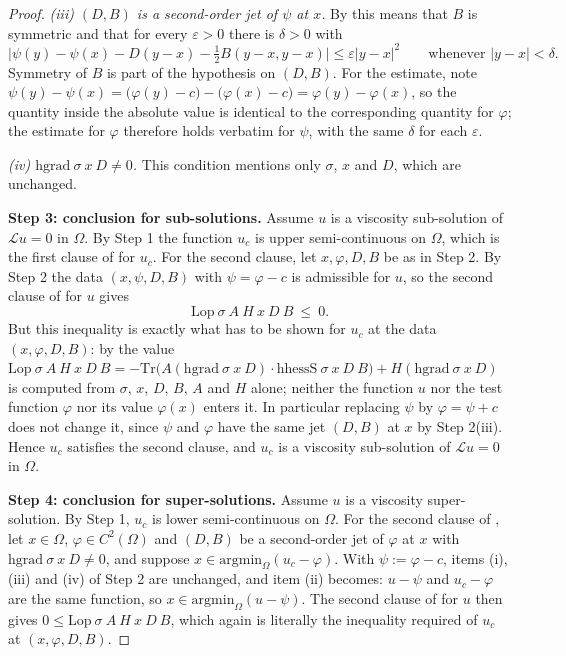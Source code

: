 \begin{proof}
\emph{(iii) $(D,B)$ is a second-order jet of $\psi$ at $x$.} By  this
means that $B$ is symmetric and that for every $\varepsilon>0$ there is $\delta>0$ with
\[
 \Big|\psi(y)-\psi(x)-D(y-x)-\tfrac12B(y-x,y-x)\Big|\le\varepsilon|y-x|^{2}
 \qquad\text{whenever }|y-x|<\delta .
\]
Symmetry of $B$ is part of the hypothesis on $(D,B)$. For the estimate, note
$\psi(y)-\psi(x)=\big(\varphi(y)-c\big)-\big(\varphi(x)-c\big)=\varphi(y)-\varphi(x)$, so
the quantity inside the absolute value is identical to the corresponding quantity for
$\varphi$; the estimate for $\varphi$ therefore holds verbatim for $\psi$, with the same
$\delta$ for each $\varepsilon$.

\emph{(iv) $\mathrm{hgrad}\ \sigma\ x\ D\ne0$.} This condition mentions only $\sigma$, $x$
and $D$, which are unchanged.

\medskip\noindent\textbf{Step 3: conclusion for sub-solutions.} Assume $u$ is a viscosity
sub-solution of $\mathcal Lu=0$ in $\Omega$. By Step 1 the function $u_c$ is upper
semi-continuous on $\Omega$, which is the first clause of  for $u_c$.
For the second clause, let $x,\varphi,D,B$ be as in Step 2. By Step 2 the data
$(x,\psi,D,B)$ with $\psi=\varphi-c$ is admissible for $u$, so the second clause of
 for $u$ gives
\[
 \mathrm{Lop}\ \sigma\ A\ H\ x\ D\ B\ \le\ 0 .
\]
But this inequality is exactly what has to be shown for $u_c$ at the data
$(x,\varphi,D,B)$: by  the value
$\mathrm{Lop}\ \sigma\ A\ H\ x\ D\ B=-\mathrm{Tr}\big(A(\mathrm{hgrad}\ \sigma\ x\ D)\cdot
\mathrm{hhessS}\ \sigma\ x\ D\ B\big)+H(\mathrm{hgrad}\ \sigma\ x\ D)$ is computed from
$\sigma$, $x$, $D$, $B$, $A$ and $H$ alone; neither the function $u$ nor the test function
$\varphi$ nor its value $\varphi(x)$ enters it. In particular replacing $\psi$ by
$\varphi=\psi+c$ does not change it, since $\psi$ and $\varphi$ have the same jet $(D,B)$ at
$x$ by Step 2(iii). Hence $u_c$ satisfies the second clause, and $u_c$ is a viscosity
sub-solution of $\mathcal Lu=0$ in $\Omega$.

\medskip\noindent\textbf{Step 4: conclusion for super-solutions.} Assume $u$ is a viscosity
super-solution. By Step 1, $u_c$ is lower semi-continuous on $\Omega$. For the second clause
of , let $x\in\Omega$, $\varphi\in C^{2}(\Omega)$ and $(D,B)$ be a
second-order jet of $\varphi$ at $x$ with $\mathrm{hgrad}\ \sigma\ x\ D\ne0$, and suppose
$x\in\mathrm{argmin}_\Omega(u_c-\varphi)$. With $\psi:=\varphi-c$, items (i), (iii) and (iv)
of Step 2 are unchanged, and item (ii) becomes: $u-\psi$ and $u_c-\varphi$ are the same
function, so $x\in\mathrm{argmin}_\Omega(u-\psi)$. The second clause of
 for $u$ then gives
$0\le\mathrm{Lop}\ \sigma\ A\ H\ x\ D\ B$, which again is literally the inequality required
of $u_c$ at $(x,\varphi,D,B)$.


\end{proof}
